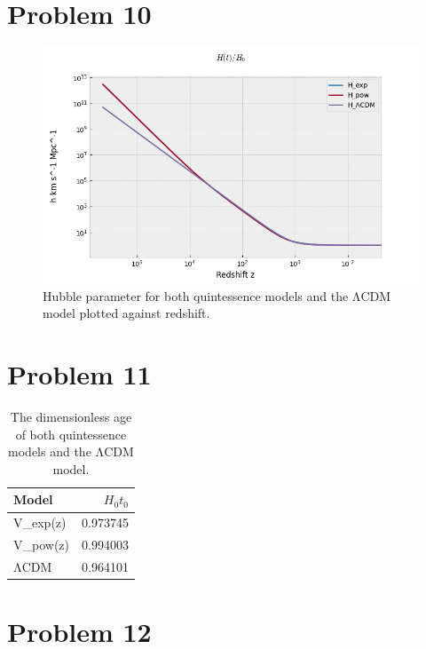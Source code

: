 \documentclass[reprint,english,notitlepage]{revtex4-1}  %
\begin{document}
\section{Problem 10}

\begin{figure}[h!]
	\includegraphics[scale=0.4]{Hubble_param.png}
	\caption{Hubble parameter for both quintessence models and the ΛCDM model plotted
	against redshift.}
	\label{fig:hubble}
\end{figure}

\section{Problem 11}

\begin{table}
	\begin{tabular}{|l|r|}
\hline
 Model   &     $H_0t_0$ \\
\hline
 V_{exp}(z)     & 0.973745 \\
 V_{pow}(z) & 0.994003 \\
 ΛCDM       & 0.964101 \\
\hline
\end{tabular}
	\caption{The dimensionless age of both quintessence models and the ΛCDM model.}
	\label{}
\end{table}

\section{Problem 12}
\end{document}
